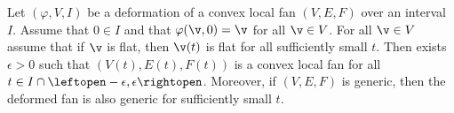 \begin{lemma}[]\label{lemma:fan-open}
Let $(\varphi,V,I)$ be a deformation of a convex local fan $(V,E,F)$ over an
interval $I$.  Assume that $0\in I$ and that $\varphi(\v,0)=\v$ for
all $\v\in V$.  For all $\v\in V$ assume that if
$\v$ is flat, then $\v(t)$ is flat for all sufficiently small $t$.
Then exists $\epsilon>0$ such that $(V(t),E(t),F(t))$ is a convex local fan
for all $t\in I\cap \leftopen-\epsilon,\epsilon\rightopen$.  
Moreover,  if $(V,E,F)$ is
generic, then the deformed fan is also generic for sufficiently small
$t$.
\end{lemma}

